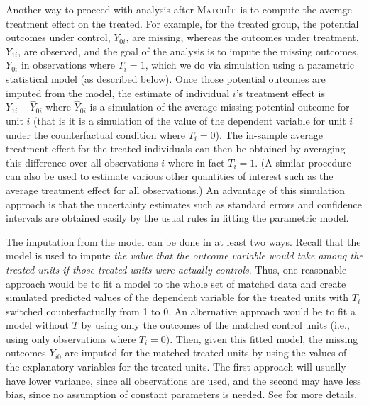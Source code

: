 \documentclass[oneside,letterpaper,titlepage]{article}
\newcommand{\MatchIt}{\textsc{MatchIt}}
\begin{document}
Another way to proceed with analysis after \MatchIt\ is to compute the
average treatment effect on the treated.  For example, for the treated
group, the potential outcomes under control, $Y_{0i}$, are missing,
whereas the outcomes under treatment, $Y_{1i}$, are observed, and the
goal of the analysis is to impute the missing outcomes, $Y_{0i}$ in
observations where $T_i=1$, which we do via simulation using a
parametric statistical model (as described below).  Once those
potential outcomes are imputed from the model, the estimate of
individual $i$'s treatment effect is $Y_{1i}-\widehat{Y}_{0i}$ where
$\widehat{Y}_{0i}$ is a simulation of the average missing potential
outcome for unit $i$ (that is it is a simulation of the value of the
dependent variable for unit $i$ under the counterfactual condition
where $T_i=0$).  The in-sample average treatment effect for the
treated individuals can then be obtained by averaging this
difference over all observations $i$ where in fact $T_i=1$.  (A similar
procedure can also be used to estimate various other quantities of
interest such as the average treatment effect for all observations.)
An advantage of this simulation approach is that the uncertainty
estimates such as standard errors and confidence intervals are
obtained easily by the usual rules in fitting the parametric model.

The imputation from the model can be done in at least two ways.
Recall that the model is used to impute \emph{the value that the
  outcome variable would take among the treated units if those treated
  units were actually controls}.  Thus, one reasonable approach would
be to fit a model to the whole set of matched data and create
simulated predicted values of the dependent variable for the treated
units with $T_i$ switched counterfactually from 1 to 0.  An
alternative approach would be to fit a model without $T$ by using only
the outcomes of the matched control units (i.e., using only
observations where $T_i=0$).  Then, given this fitted model, the
missing outcomes $Y_{i0}$ are imputed for the matched treated units by
using the values of the explanatory variables for the treated units.
The first approach will usually have lower variance, since all
observations are used, and the second may have less bias, since no
assumption of constant parameters is needed.  See \citep{HoImaKin05}
for more details.

\end{document}
